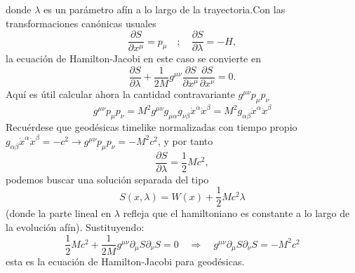 donde $\lambda$ es un parámetro afín a lo largo de la trayectoria.Con las transformaciones canónicas usuales
\begin{equation}
    \frac{\partial S}{\partial x^\mu} = p_\mu \quad ; \quad \frac{\partial S}{\partial \lambda} = -H,
\end{equation}
la ecuación de Hamilton-Jacobi en este caso se convierte en
\begin{equation}
\frac{\partial S}{\partial \lambda}+\frac{1}{2M} g^{\mu \nu} \frac{\partial S}{\partial x^\mu}  \frac{\partial S}{\partial x^\nu} =0.
\end{equation}
Aquí es útil calcular ahora la cantidad contravariante $g^{\mu \nu} p_\mu p_\nu$ 
\begin{equation}
g^{\mu \nu} p_\mu p_\nu=M^2 g^{\mu \nu} g_{\mu \alpha} g_{\nu \beta} \dot{x}^\alpha \dot{x}^\beta=M^2 g_{\alpha \beta} \dot{x}^\alpha \dot{x}^\beta
\end{equation}
Recuérdese que geodésicas timelike normalizadas con tiempo propio $g_{\alpha \beta} \dot{x}^\alpha \dot{x}^\beta=-c^2 \rightarrow g^{\mu \nu} p_\mu p_\nu=-M^2 c^2$, y por tanto
\begin{equation}
\frac{\partial S}{\partial \lambda}=\frac{1}{2} M c^2,
\end{equation}
podemos buscar una solución separada del tipo
\begin{equation}
S(x, \lambda)=W(x)+\frac{1}{2} Mc^2 \lambda
\end{equation}
(donde la parte lineal en $\lambda$ refleja que el hamiltoniano es constante a lo largo de la evolución afín). 
Sustituyendo:
\begin{equation}
    \frac{1}{2} Mc^2+\frac{1}{2 M} g^{\mu \nu} \partial_\mu S \partial_\nu S=0 \quad \Longrightarrow \quad g^{\mu \nu} \partial_\mu S \partial_\nu S=-M^2 c^2
    \label{eq:geodesicHamiltonJacobi}
\end{equation}
esta es la ecuación de Hamilton-Jacobi para geodésicas.
